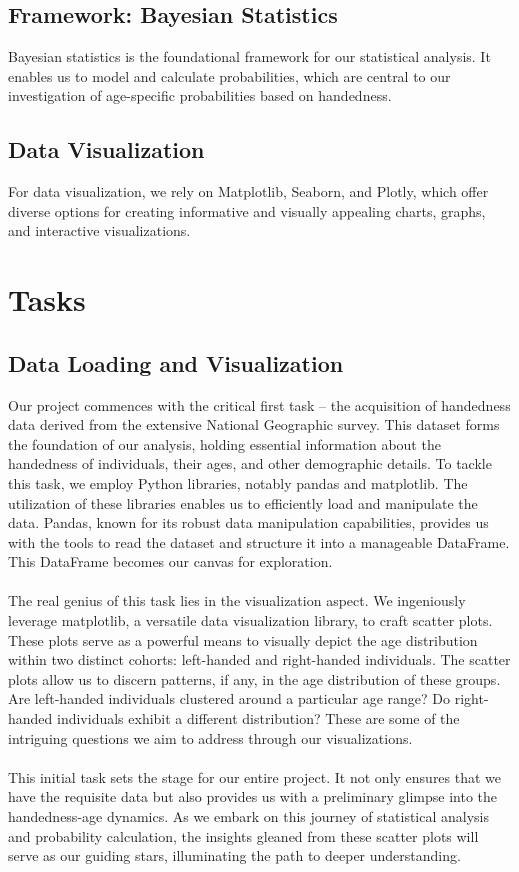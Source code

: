 \documentclass{article}
\begin{document}
\subsection{Framework: Bayesian Statistics}
Bayesian statistics is the foundational framework for our statistical analysis. It enables us to model and calculate probabilities, which are central to our investigation of age-specific probabilities based on handedness.
\vspace{0.3cm}
\subsection{Data Visualization}
For data visualization, we rely on Matplotlib, Seaborn, and Plotly, which offer diverse options for creating informative and visually appealing charts, graphs, and interactive visualizations.

\section{Tasks}
\vspace{0.3cm}
\subsection{Data Loading and Visualization}
Our project commences with the critical first task – the acquisition of handedness data derived from the extensive National Geographic survey. This dataset forms the foundation of our analysis, holding essential information about the handedness of individuals, their ages, and other demographic details. To tackle this task, we employ Python libraries, notably pandas and matplotlib. The utilization of these libraries enables us to efficiently load and manipulate the data. Pandas, known for its robust data manipulation capabilities, provides us with the tools to read the dataset and structure it into a manageable DataFrame. This DataFrame becomes our canvas for exploration.\\ \\ The real genius of this task lies in the visualization aspect. We ingeniously leverage matplotlib, a versatile data visualization library, to craft scatter plots. These plots serve as a powerful means to visually depict the age distribution within two distinct cohorts: left-handed and right-handed individuals. The scatter plots allow us to discern patterns, if any, in the age distribution of these groups. Are left-handed individuals clustered around a particular age range? Do right-handed individuals exhibit a different distribution? These are some of the intriguing questions we aim to address through our visualizations.\\ \\ This initial task sets the stage for our entire project. It not only ensures that we have the requisite data but also provides us with a preliminary glimpse into the handedness-age dynamics. As we embark on this journey of statistical analysis and probability calculation, the insights gleaned from these scatter plots will serve as our guiding stars, illuminating the path to deeper understanding.
\newline \\
\end{document}
